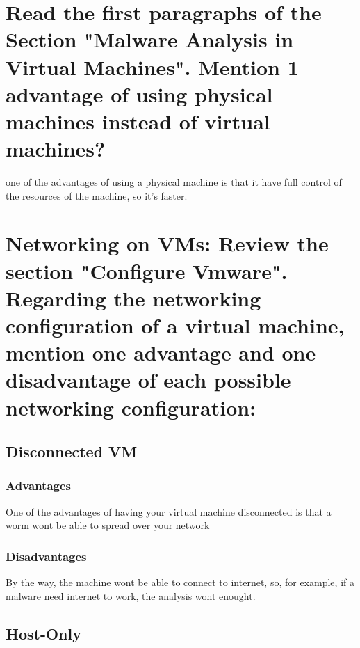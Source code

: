 \documentclass[10pt,a4paper]{article} %
\begin{document}
    \title{\rmfamily\normalfont{}}
    \author{}
    \date{\today}

    \maketitle


    \section{Read the first paragraphs of the Section "Malware Analysis in
    Virtual Machines". Mention 1 advantage of using physical machines instead
    of virtual machines?}
        one of the advantages of using a physical machine is that it have full
        control of the resources of the machine, so it's faster.

    \section{Networking on VMs: Review the section "Configure Vmware".
    Regarding the networking configuration of a virtual machine, mention one
    advantage and one disadvantage of each possible networking configuration:}

        \subsection{Disconnected VM}
            \subsubsection{Advantages}
                One of the advantages of having your virtual machine
                disconnected is that a worm wont be able to spread over your
                network
            \subsubsection{Disadvantages}
                By the way, the machine wont be able to connect to internet,
                so, for example, if a malware need internet to work, the
                analysis wont enought.

        \subsection{Host-Only}
\end{document}
